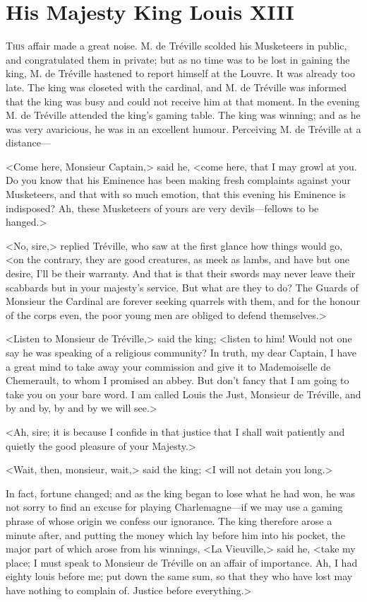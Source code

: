 
\chapter{His Majesty King Louis XIII}

\lettrine[]{T}{his} affair made a great noise. M. de Tréville scolded his Musketeers in public, and congratulated them in private; but as no time was to be lost in gaining the king, M. de Tréville hastened to report himself at the Louvre. It was already too late. The king was closeted with the cardinal, and M. de Tréville was informed that the king was busy and could not receive him at that moment. In the evening M. de Tréville attended the king's gaming table. The king was winning; and as he was very avaricious, he was in an excellent humour. Perceiving M. de Tréville at a distance--- 

<Come here, Monsieur Captain,> said he, <come here, that I may growl at you. Do you know that his Eminence has been making fresh complaints against your Musketeers, and that with so much emotion, that this evening his Eminence is indisposed? Ah, these Musketeers of yours are very devils---fellows to be hanged.> 

<No, sire,> replied Tréville, who saw at the first glance how things would go, <on the contrary, they are good creatures, as meek as lambs, and have but one desire, I'll be their warranty. And that is that their swords may never leave their scabbards but in your majesty's service. But what are they to do? The Guards of Monsieur the Cardinal are forever seeking quarrels with them, and for the honour of the corps even, the poor young men are obliged to defend themselves.> 

<Listen to Monsieur de Tréville,> said the king; <listen to him! Would not one say he was speaking of a religious community? In truth, my dear Captain, I have a great mind to take away your commission and give it to Mademoiselle de Chemerault, to whom I promised an abbey. But don't fancy that I am going to take you on your bare word. I am called Louis the Just, Monsieur de Tréville, and by and by, by and by we will see.> 

<Ah, sire; it is because I confide in that justice that I shall wait patiently and quietly the good pleasure of your Majesty.> 

<Wait, then, monsieur, wait,> said the king; <I will not detain you long.> 

In fact, fortune changed; and as the king began to lose what he had won, he was not sorry to find an excuse for playing Charlemagne---if we may use a gaming phrase of whose origin we confess our ignorance. The king therefore arose a minute after, and putting the money which lay before him into his pocket, the major part of which arose from his winnings, <La Vieuville,> said he, <take my place; I must speak to Monsieur de Tréville on an affair of importance. Ah, I had eighty louis before me; put down the same sum, so that they who have lost may have nothing to complain of. Justice before everything.> 

